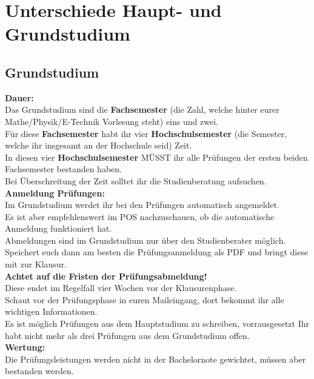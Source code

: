 \chapter{Unterschiede Haupt- und Grundstudium}


%


\section{Grundstudium}

\textbf{Dauer:}\\
Das Grundstudium sind die \textbf{Fachsemester} (die Zahl, welche hinter eurer Mathe/Physik/E-Technik Vorlesung steht) eins und zwei.\\
Für diese \textbf{Fachsemester} habt ihr vier \textbf{Hochschulsemester} (die Semester, welche ihr insgesamt an der Hochschule seid) Zeit.\\
In diesen vier \textbf{Hochschulsemester} MÜSST ihr alle Prüfungen der ersten beiden Fachsemester bestanden haben.\\
Bei Überschreitung der Zeit solltet ihr die Studienberatung aufsuchen.\\

\textbf{Anmeldung Prüfungen:}\\
Im Grundstudium werdet ihr bei den Prüfungen automatisch angemeldet.\\
Es ist aber empfehlenswert im POS nachzuschauen, ob die automatische Anmeldung funktioniert hat.\\
Abmeldungen sind im Grundstudium nur über den Studienberater möglich.\\
Speichert euch dann am besten die Prüfungsanmeldung als PDF und bringt diese mit zur Klausur.\\
\textbf{Achtet auf die Fristen der Prüfungsabmeldung!}\\ %
Diese endet im Regelfall vier Wochen vor der Klausurenphase.\\
Schaut vor der Prüfungsphase in euren Maileingang, dort bekommt ihr alle wichtigen Informationen.\\
Es ist möglich Prüfungen aus dem Hauptstudium zu schreiben, vorrausgesetzt Ihr habt nicht mehr als drei Prüfungen aus dem Grundstudium offen.\\

\textbf{Wertung:}\\
Die Prüfungsleistungen werden nicht in der Bachelornote gewichtet, müssen aber bestanden werden.\\ 

